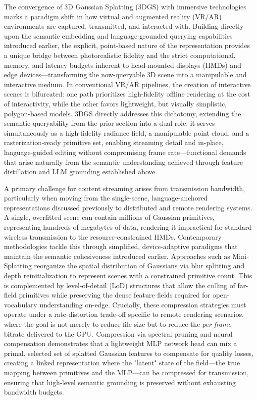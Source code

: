 \documentclass[11pt,a4paper]{article}
\begin{document}
The convergence of 3D Gaussian Splatting (3DGS) with immersive technologies marks a paradigm shift in how virtual and augmented reality (VR/AR) environments are captured, transmitted, and interacted with. Building directly upon the semantic embedding and language-grounded querying capabilities introduced earlier, the explicit, point-based nature of the representation provides a unique bridge between photorealistic fidelity and the strict computational, memory, and latency budgets inherent to head-mounted displays (HMDs) and edge devices---transforming the now-queryable 3D scene into a manipulable and interactive medium. In conventional VR/AR pipelines, the creation of interactive scenes is bifurcated: one path prioritizes high-fidelity offline rendering at the cost of interactivity, while the other favors lightweight, but visually simplistic, polygon-based models. 3DGS directly addresses this dichotomy, extending the semantic queryability from the prior section into a dual role: it serves simultaneously as a high-fidelity radiance field, a manipulable point cloud, and a rasterization-ready primitive set, enabling streaming detail and in-place, language-guided editing without compromising frame rate---functional demands that arise naturally from the semantic understanding achieved through feature distillation and LLM grounding established above.

A primary challenge for content streaming arises from transmission bandwidth, particularly when moving from the single-scene, language-anchored representations discussed previously to distributed and remote rendering systems. A single, overfitted scene can contain millions of Gaussian primitives, representing hundreds of megabytes of data, rendering it impractical for standard wireless transmission to the resource-constrained HMDs. Contemporary methodologies tackle this through simplified, device-adaptive paradigms that maintain the semantic cohesiveness introduced earlier. Approaches such as Mini-Splatting \cite{arxiv:2403.14166v1} reorganize the spatial distribution of Gaussians via blur splitting and depth reinitialization to represent scenes with a constrained primitive count. This is complemented by level-of-detail (LoD) structures that allow the culling of far-field primitives while preserving the dense feature fields required for open-vocabulary understanding on-edge. Crucially, these compression strategies must operate under a rate-distortion trade-off specific to remote rendering scenarios, where the goal is not merely to reduce file size but to reduce the \emph{per-frame} bitrate delivered to the GPU. Compression via spectral pruning and neural compensation \cite{arxiv:2405.00676v1} demonstrates that a lightweight MLP network head can mix a primal, selected set of splatted Gaussian features to compensate for quality losses, creating a linked representation where the "latent" state of the field---the true mapping between primitives and the MLP---can be compressed for transmission, ensuring that high-level semantic grounding is preserved without exhausting bandwidth budgets.
\end{document}
